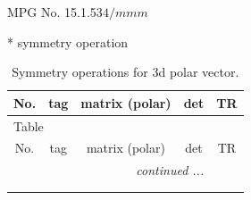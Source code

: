\documentclass[fleqn,8pt]{jsarticle}
\begin{document}
\setcounter{MaxMatrixCols}{32}

\renewcommand{\tablename}{Table~}
\renewcommand{\figurename}{Figure~}
\begin{center}
\LARGE
MPG No. 15.1.53\quad$4/mmm$
\end{center}
* symmetry operation
\renewcommand{\arraystretch}{1.3}
\begin{longtable}{ccccc}
\caption{Symmetry operations for 3d polar vector.}
 \\
 \hline \hline
No. & tag & matrix (polar) & det & TR \\ \hline \endfirsthead

\multicolumn{4}{l}{\tablename\ \thetable{}} \\
 \hline \hline
No. & tag & matrix (polar) & det & TR \\ \hline \endhead

 \hline \hline
\multicolumn{4}{r}{\footnotesize\it continued ...} \\ \endfoot

 \hline \hline
\multicolumn{4}{r}{} \\ \endlastfoot


\end{longtable}
\end{document}
